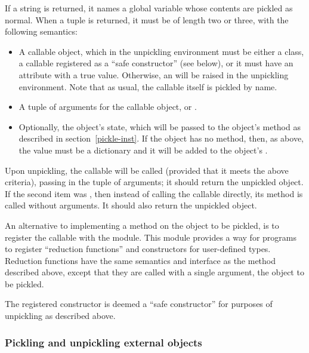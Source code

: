 If a string is returned, it names a global variable whose contents are
pickled as normal.  When a tuple is returned, it must be of length two
or three, with the following semantics:

\begin{itemize}

\item A callable object, which in the unpickling environment must be
      either a class, a callable registered as a ``safe constructor''
      (see below), or it must have an attribute
       with a true value.  Otherwise,
      an  will be raised in the unpickling
      environment.  Note that as usual, the callable itself is pickled
      by name.

\item A tuple of arguments for the callable object, or .

\item Optionally, the object's state, which will be passed to
      the object's  method as described in
      section~\ref{pickle-inst}.  If the object has no
       method, then, as above, the value must
      be a dictionary and it will be added to the object's
      .

\end{itemize}

Upon unpickling, the callable will be called (provided that it meets
the above criteria), passing in the tuple of arguments; it should
return the unpickled object.  If the second item was , then
instead of calling the callable directly, its 
method is called without arguments.  It should also return the
unpickled object.

An alternative to implementing a  method on the
object to be pickled, is to register the callable with the
 module.  This module provides a way
for programs to register ``reduction functions'' and constructors for
user-defined types.   Reduction functions have the same semantics and
interface as the  method described above, except
that they are called with a single argument, the object to be pickled.

The registered constructor is deemed a ``safe constructor'' for purposes
of unpickling as described above.

\subsubsection{Pickling and unpickling external objects}

